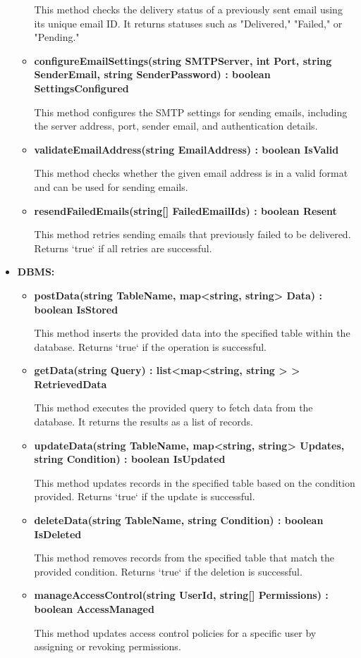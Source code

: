\begin{itemize}
\begin{itemize}
This method checks the delivery status of a previously sent email using its unique email ID. It returns statuses such as "Delivered," "Failed," or "Pending."

\item \textbf{configureEmailSettings(string SMTPServer, int Port, string SenderEmail, string SenderPassword) : boolean SettingsConfigured}  

This method configures the SMTP settings for sending emails, including the server address, port, sender email, and authentication details.

\item \textbf{validateEmailAddress(string EmailAddress) : boolean IsValid}  

This method checks whether the given email address is in a valid format and can be used for sending emails.

\item \textbf{resendFailedEmails(string[] FailedEmailIds) : boolean Resent}  

This method retries sending emails that previously failed to be delivered. Returns `true` if all retries are successful.
\end{itemize}

\item \textbf{DBMS:}
\begin{itemize}
\item \textbf{postData(string TableName, map<string, string> Data) : boolean IsStored} 

This method inserts the provided data into the specified table within the database. Returns `true` if the operation is successful.

\item \textbf{getData(string Query) : list<map<string, string > > RetrievedData}  

This method executes the provided query to fetch data from the database. It returns the results as a list of records.

\item \textbf{updateData(string TableName, map<string, string> Updates, string Condition) : boolean IsUpdated}

This method updates records in the specified table based on the condition provided. Returns `true` if the update is successful.

\item \textbf{deleteData(string TableName, string Condition) : boolean IsDeleted}  

This method removes records from the specified table that match the provided condition. Returns `true` if the deletion is successful.

\item \textbf{manageAccessControl(string UserId, string[] Permissions) : boolean AccessManaged}  

This method updates access control policies for a specific user by assigning or revoking permissions.

\end{itemize}
\end{itemize}


